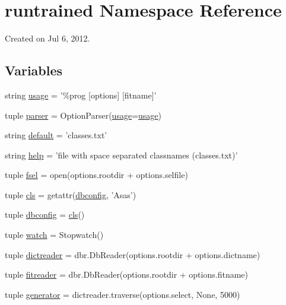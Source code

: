 \hypertarget{namespaceruntrained}{
\section{runtrained Namespace Reference}
\label{namespaceruntrained}
}


Created on Jul 6, 2012.  


\subsection*{Variables}
\begin{DoxyCompactItemize}
\item 
string \hyperlink{namespaceruntrained_a4b1ea2d8f802d90d901c0d20819bc700}{usage} = '\%prog \mbox{[}options\mbox{]} \mbox{[}fitname\mbox{]}'
\item 
tuple \hyperlink{namespaceruntrained_a965f57e18609caa1e9410347cae7af38}{parser} = OptionParser(\hyperlink{namespaceruntrained_a4b1ea2d8f802d90d901c0d20819bc700}{usage}=\hyperlink{namespaceruntrained_a4b1ea2d8f802d90d901c0d20819bc700}{usage})
\item 
string \hyperlink{namespaceruntrained_a444d9fa1b0629211e1fccae2f9bb06fb}{default} = 'classes.txt'
\item 
string \hyperlink{namespaceruntrained_a32ffe7cf2f0e4d678b595d78bfdf3305}{help} = 'file with space separated classnames (classes.txt)'
\item 
tuple \hyperlink{namespaceruntrained_af1d361ee115528276a9091cc15b6a1e3}{fsel} = open(options.rootdir + options.selfile)
\item 
tuple \hyperlink{namespaceruntrained_a0781c6ec0fc8913052bfd0a74cdc84a0}{cls} = getattr(\hyperlink{namespaceruntrained_a61e7eef55d8919327ea79f96cc9e9b7f}{dbconfig}, 'Asas')
\item 
tuple \hyperlink{namespaceruntrained_a61e7eef55d8919327ea79f96cc9e9b7f}{dbconfig} = \hyperlink{namespaceruntrained_a0781c6ec0fc8913052bfd0a74cdc84a0}{cls}()
\item 
tuple \hyperlink{namespaceruntrained_a09e3ebddf40293824933bec6451dfd9a}{watch} = Stopwatch()
\item 
tuple \hyperlink{namespaceruntrained_a1593f2f52d1b27e50d8576ba7f72ef1e}{dictreader} = dbr.DbReader(options.rootdir + options.dictname)
\item 
tuple \hyperlink{namespaceruntrained_a72631b46f06124a8e59941c86e742ddd}{fitreader} = dbr.DbReader(options.rootdir + options.fitname)
\item 
tuple \hyperlink{namespaceruntrained_a2a2f2ebf0c161ef1aed89d58b4fa0c9e}{generator} = dictreader.traverse(options.select, None, 5000)

\end{DoxyCompactItemize}
